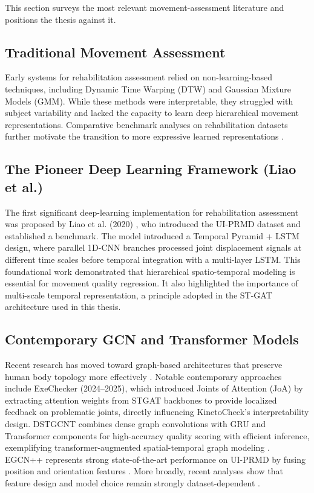 This section surveys the most relevant movement-assessment literature and positions the thesis against it.

\subsection{Traditional Movement Assessment}
\label{subsec:rw-traditional}

Early systems for rehabilitation assessment relied on non-learning-based techniques, including Dynamic Time Warping (DTW) and Gaussian Mixture Models (GMM). While these methods were interpretable, they struggled with subject variability and lacked the capacity to learn deep hierarchical movement representations. Comparative benchmark analyses on rehabilitation datasets further motivate the transition to more expressive learned representations \cite{ZGAA25}.

\subsection{The Pioneer Deep Learning Framework (Liao et al.)}
\label{subsec:rw-liao}

The first significant deep-learning implementation for rehabilitation assessment was proposed by Liao et al. (2020) \cite{LVX20}, who introduced the UI-PRMD dataset and established a benchmark. The model introduced a Temporal Pyramid + LSTM design, where parallel 1D-CNN branches processed joint displacement signals at different time scales before temporal integration with a multi-layer LSTM. This foundational work demonstrated that hierarchical spatio-temporal modeling is essential for movement quality regression. It also highlighted the importance of multi-scale temporal representation, a principle adopted in the ST-GAT architecture used in this thesis.

\subsection{Contemporary GCN and Transformer Models}
\label{subsec:rw-contemporary}

Recent research has moved toward graph-based architectures that preserve human body topology more effectively \cite{CXJS22,GYDD18}. Notable contemporary approaches include ExeChecker (2024–2025), which introduced Joints of Attention (JoA) by extracting attention weights from STGAT backbones to provide localized feedback on problematic joints, directly influencing KinetoCheck’s interpretability design. DSTGCNT combines dense graph convolutions with GRU and Transformer components for high-accuracy quality scoring with efficient inference, exemplifying transformer-augmented spatial-temporal graph modeling \cite{CXJS22}. EGCN++ represents strong state-of-the-art performance on UI-PRMD by fusing position and orientation features \cite{yu2024egcn}. More broadly, recent analyses show that feature design and model choice remain strongly dataset-dependent \cite{ZGAA25}.

